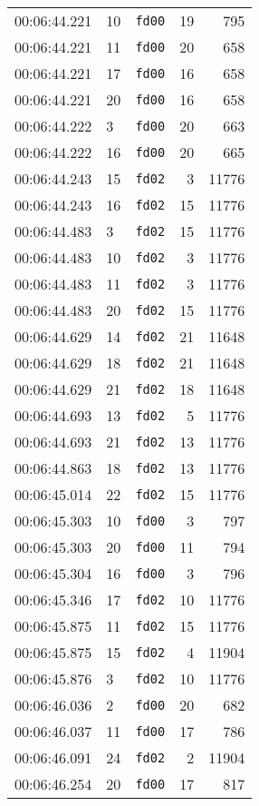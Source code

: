 \documentclass{article}
\begin{document}
\begin{longtable}{lllrr}
00:06:44.221 & 10 & \texttt{fd00} & 19 & 795 \\
00:06:44.221 & 11 & \texttt{fd00} & 20 & 658 \\
00:06:44.221 & 17 & \texttt{fd00} & 16 & 658 \\
00:06:44.221 & 20 & \texttt{fd00} & 16 & 658 \\
00:06:44.222 & 3 & \texttt{fd00} & 20 & 663 \\
00:06:44.222 & 16 & \texttt{fd00} & 20 & 665 \\
00:06:44.243 & 15 & \texttt{fd02} & 3 & 11776 \\
00:06:44.243 & 16 & \texttt{fd02} & 15 & 11776 \\
00:06:44.483 & 3 & \texttt{fd02} & 15 & 11776 \\
00:06:44.483 & 10 & \texttt{fd02} & 3 & 11776 \\
00:06:44.483 & 11 & \texttt{fd02} & 3 & 11776 \\
00:06:44.483 & 20 & \texttt{fd02} & 15 & 11776 \\
00:06:44.629 & 14 & \texttt{fd02} & 21 & 11648 \\
00:06:44.629 & 18 & \texttt{fd02} & 21 & 11648 \\
00:06:44.629 & 21 & \texttt{fd02} & 18 & 11648 \\
00:06:44.693 & 13 & \texttt{fd02} & 5 & 11776 \\
00:06:44.693 & 21 & \texttt{fd02} & 13 & 11776 \\
00:06:44.863 & 18 & \texttt{fd02} & 13 & 11776 \\
00:06:45.014 & 22 & \texttt{fd02} & 15 & 11776 \\
00:06:45.303 & 10 & \texttt{fd00} & 3 & 797 \\
00:06:45.303 & 20 & \texttt{fd00} & 11 & 794 \\
00:06:45.304 & 16 & \texttt{fd00} & 3 & 796 \\
00:06:45.346 & 17 & \texttt{fd02} & 10 & 11776 \\
00:06:45.875 & 11 & \texttt{fd02} & 15 & 11776 \\
00:06:45.875 & 15 & \texttt{fd02} & 4 & 11904 \\
00:06:45.876 & 3 & \texttt{fd02} & 10 & 11776 \\
00:06:46.036 & 2 & \texttt{fd00} & 20 & 682 \\
00:06:46.037 & 11 & \texttt{fd00} & 17 & 786 \\
00:06:46.091 & 24 & \texttt{fd02} & 2 & 11904 \\
00:06:46.254 & 20 & \texttt{fd00} & 17 & 817 \\

\end{longtable}
\end{document}
